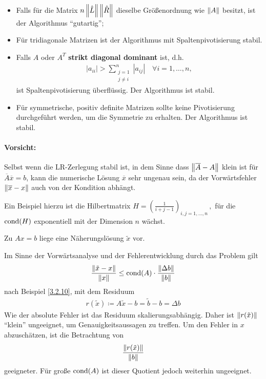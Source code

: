 \label{III.3.13}
\begin{itemize}
\item Falls für die Matrix $n\nn[\hat{L}]\nn[\hat{R}]$ 
  dieselbe Größenordnung wie $\nn[A]$ besitzt, ist der
  Algorithmus \enquote{gutartig};
\item Für tridiagonale Matrizen  ist der Algorithmus mit
  Spaltenpivotisierung stabil.
\item Falls $ A$ oder $ A^T$  \textbf{strikt diagonal
    dominant} ist, d.h. 
  \begin{gather*}
    |a_{ii}| > \sum\limits_{\substack{j=1 \\ j \neq i}}^{n} |a_{ij}| 
    \quad \forall i = 1, \dotsc, n,
  \end{gather*}
  ist Spaltenpivotisierung überflüssig. Der Algorithmus ist stabil.
\item Für symmetrische, positiv definite Matrizen sollte keine Pivotisierung
  durchgeführt werden, um die Symmetrie zu erhalten.
  Der Algorithmus ist stabil.
\end{itemize}

\paragraph{Vorsicht:}
Selbst wenn die LR-Zerlegung stabil ist, in dem Sinne dass
$\nn[\overline{A} - A]$ klein ist für
$ \overline{A}\overline{x} = b $, 
kann die numerische Lösung $\overline{ x}$ sehr
ungenau sein, da der Vorwärtsfehler $\nn[\overline{x}-{x}]$ auch von der
Kondition abhängt.

Ein Beispiel hierzu ist die Hilbertmatrix
$  H  =  \left( \frac{1}{i + j -1 } \right)_{i,j= 1,\dotsc, n}\, ,$
für die $\Cond ( H)$ exponentiell mit der Dimension $n$ wächst.


Zu $Ax=b$ liege eine Näherungslösung $\tilde{x}$ vor.

Im Sinne der Vorwärtsanalyse und der Fehlerentwicklung durch das Problem gilt
\begin{gather*}
  \frac{\nn[\tilde{x}-x]}{\nn[x]} 
  \leq \Cond(A) \cdot \frac{\nn[\Delta b]}{\nn[b]}
\end{gather*}
nach Beispiel \ref{3.2.10}, 
mit dem Residuum 
\begin{gather}
  r(\tilde{x})  
  \coloneqq A\tilde{x} - b
  = \widetilde{b}-b
  = \Delta b
  \label{III.4.1}
\end{gather}
Wie der absolute Fehler ist das Residuum skalierungsabhängig.
Daher ist $\nn[r(\tilde{x})]$ \enquote{klein} ungeeignet, um
Genauigkeitsaussagen zu treffen.
Um den Fehler in $x$ abzuschätzen, ist die Betrachtung von 
\begin{gather}
  \frac{\nn[r(\tilde{x})]}{\nn[b]} \label{III.4.2}
\end{gather}
geeigneter. 
Für große $\Cond(A)$ ist dieser Quotient jedoch weiterhin ungeeignet.

